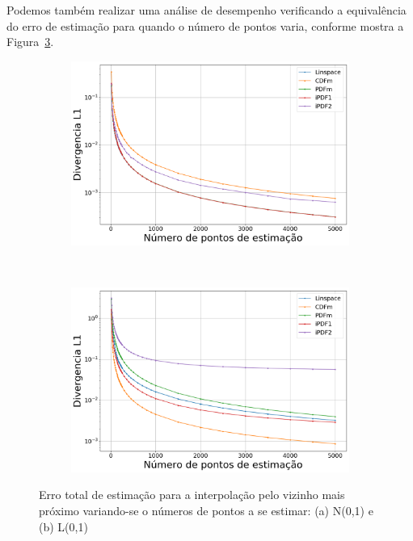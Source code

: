 Podemos também realizar uma análise de desempenho verificando a equivalência do erro de estimação para quando o número de pontos varia, conforme mostra a Figura~\ref{fig:errorplotnearest}.

\begin{figure}[H]
	\centering
	\begin{subfigure}[b]{0.45\textwidth}
		\centering 
		\includegraphics[width=\textwidth]{./figuras/ERRORPLOT_L1_TRUE_NORMAL_NEAREST_00}
		\caption{}
		\label{fig:errornormnearest}
	\end{subfigure}
	\hfill
	~ %
	\begin{subfigure}[b]{0.45\textwidth}
		\centering 
		\includegraphics[width=\textwidth]{./figuras/ERRORPLOT_L1_TRUE_LOGNORMAL_NEAREST_00}
		\caption{}
		\label{fig:errorlognearest}
	\end{subfigure}
	
	\caption{Erro total de estimação para a interpolação pelo vizinho mais próximo variando-se o números de pontos a se estimar: (a) N(0,1) e (b) L(0,1)}
	\label{fig:errorplotnearest}
\end{figure}


